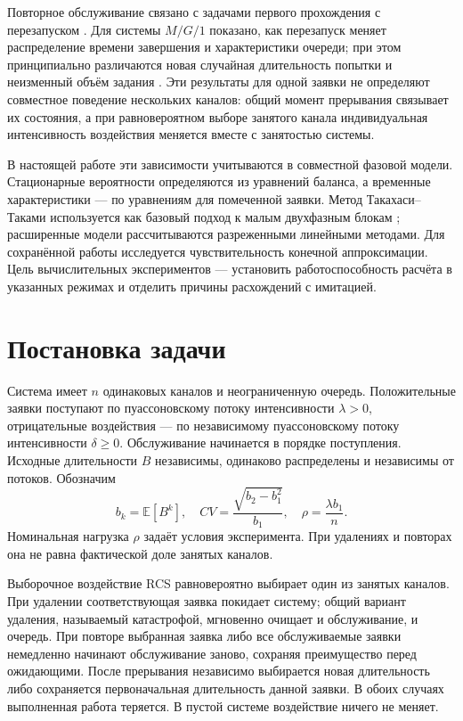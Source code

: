 Повторное обслуживание связано с задачами первого прохождения с перезапуском \cite{pal2017}. Для системы \(M/G/1\) показано, как перезапуск меняет распределение времени завершения и характеристики очереди; при этом принципиально различаются новая случайная длительность попытки и неизменный объём задания \cite{bonomo2022}. Эти результаты для одной заявки не определяют совместное поведение нескольких каналов: общий момент прерывания связывает их состояния, а при равновероятном выборе занятого канала индивидуальная интенсивность воздействия меняется вместе с занятостью системы.

В настоящей работе эти зависимости учитываются в совместной фазовой модели. Стационарные вероятности определяются из уравнений баланса, а временные характеристики --- по уравнениям для помеченной заявки. Метод Такахаси--Таками используется как базовый подход к малым двухфазным блокам \cite{takahashi1976,ryzhikov2018ru}; расширенные модели рассчитываются разреженными линейными методами. Для сохранённой работы исследуется чувствительность конечной аппроксимации. Цель вычислительных экспериментов --- установить работоспособность расчёта в указанных режимах и отделить причины расхождений с имитацией.

\section{Постановка задачи}
Система имеет \(n\) одинаковых каналов и неограниченную очередь. Положительные заявки поступают по пуассоновскому потоку интенсивности \(\lambda>0\), отрицательные воздействия --- по независимому пуассоновскому потоку интенсивности \(\delta\ge0\). Обслуживание начинается в порядке поступления. Исходные длительности \(B\) независимы, одинаково распределены и независимы от потоков. Обозначим
\[
b_k=\mathbb E[B^k],\quad CV=\frac{\sqrt{b_2-b_1^2}}{b_1},\quad \rho=\frac{\lambda b_1}{n}.
\]
Номинальная нагрузка \(\rho\) задаёт условия эксперимента. При удалениях и повторах она не равна фактической доле занятых каналов.

Выборочное воздействие RCS равновероятно выбирает один из занятых каналов. При удалении соответствующая заявка покидает систему; общий вариант удаления, называемый катастрофой, мгновенно очищает и обслуживание, и очередь. При повторе выбранная заявка либо все обслуживаемые заявки немедленно начинают обслуживание заново, сохраняя преимущество перед ожидающими. После прерывания независимо выбирается новая длительность либо сохраняется первоначальная длительность данной заявки. В обоих случаях выполненная работа теряется. В пустой системе воздействие ничего не меняет.

